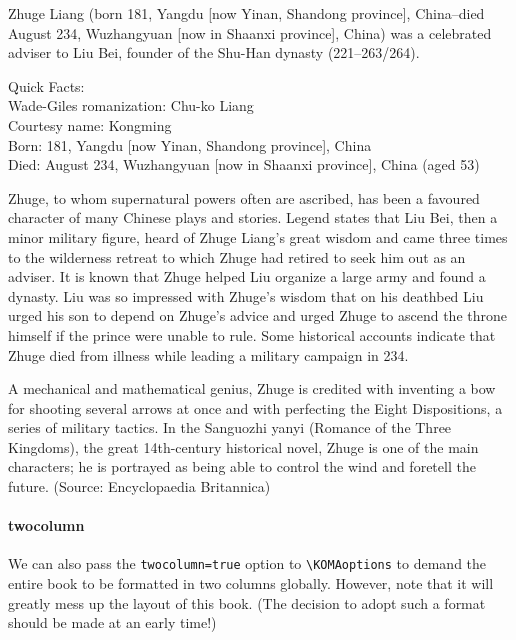 \begin{multicols}{2}
Zhuge Liang (born 181, Yangdu [now Yinan, Shandong province], China--died August 234, Wuzhangyuan [now in Shaanxi province], China) was a celebrated adviser to Liu Bei, founder of the Shu-Han dynasty (221--263/264).

Quick Facts: \\
Wade-Giles romanization: Chu-ko Liang \\
Courtesy name: Kongming \\
Born: 181, Yangdu [now Yinan, Shandong province], China \\
Died: August 234, Wuzhangyuan [now in Shaanxi province], China (aged 53)

Zhuge, to whom supernatural powers often are ascribed, has been a favoured character of many Chinese plays and stories. Legend states that Liu Bei, then a minor military figure, heard of Zhuge Liang’s great wisdom and came three times to the wilderness retreat to which Zhuge had retired to seek him out as an adviser. It is known that Zhuge helped Liu organize a large army and found a dynasty. Liu was so impressed with Zhuge’s wisdom that on his deathbed Liu urged his son to depend on Zhuge’s advice and urged Zhuge to ascend the throne himself if the prince were unable to rule. Some historical accounts indicate that Zhuge died from illness while leading a military campaign in 234.

A mechanical and mathematical genius, Zhuge is credited with inventing a bow for shooting several arrows at once and with perfecting the Eight Dispositions, a series of military tactics. In the Sanguozhi yanyi (Romance of the Three Kingdoms), the great 14th-century historical novel, Zhuge is one of the main characters; he is portrayed as being able to control the wind and foretell the future. (Source: Encyclopaedia Britannica)
\end{multicols}


\paragraph{twocolumn} We can also pass the \verb|twocolumn=true| option to \texttt{\textbackslash KOMAoptions} to demand the entire book to be formatted in two columns globally. However, note that it will greatly mess up the layout of this book. (The decision to adopt such a format should be made at an early time!)